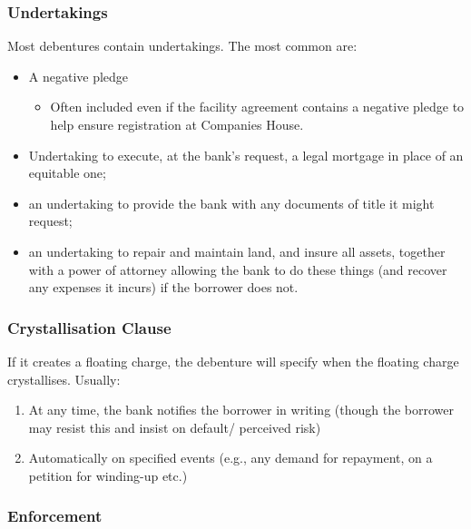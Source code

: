 \documentclass[
]{article}
\providecommand{\tightlist}{%
  \setlength{\itemsep}{0pt}\setlength{\parskip}{0pt}}
\begin{document}
\hypertarget{undertakings}{%
\subsubsection{Undertakings}\label{undertakings}}

Most debentures contain undertakings. The most common are:

\begin{itemize}
\tightlist
\item
  A negative pledge

  \begin{itemize}
  \tightlist
  \item
    Often included even if the facility agreement contains a negative
    pledge to help ensure registration at Companies House.
  \end{itemize}
\item
  Undertaking to execute, at the bank's request, a legal mortgage in
  place of an equitable one;
\item
  an undertaking to provide the bank with any documents of title it
  might request;
\item
  an undertaking to repair and maintain land, and insure all assets,
  together with a power of attorney allowing the bank to do these things
  (and recover any expenses it incurs) if the borrower does not.
\end{itemize}

\hypertarget{crystallisation-clause}{%
\subsubsection{Crystallisation Clause}\label{crystallisation-clause}}

If it creates a floating charge, the debenture will specify when the
floating charge crystallises. Usually:

\begin{enumerate}
\def\labelenumi{\arabic{enumi}.}
\tightlist
\item
  At any time, the bank notifies the borrower in writing (though the
  borrower may resist this and insist on default/ perceived risk)
\item
  Automatically on specified events (e.g., any demand for repayment, on
  a petition for winding-up etc.)
\end{enumerate}

\hypertarget{enforcement}{%
\subsubsection{Enforcement}\label{enforcement}}
\end{document}
